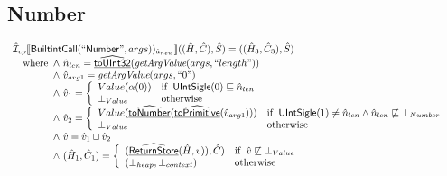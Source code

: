 \subsection{Number}
\[
\begin{array}{l}
\hat{\mathcal{I}} _{cp}\llbracket \mbox{\textsf{BuiltintCall}}(``\mbox{\textsf{Number}}",args))_{\hat{a}_{new}}\rrbracket((\hat{H},\hat{C}), \hat{S})
  = ((\hat{H}_3, \hat{C}_3), \hat{S})\\
\quad{\rm where}\begin{array}[t]{l}
  \land\ \hat{n}_{len} = \widehat{\underline{\sf toUInt32}}(\emph{getArgValue}(args, ``length"))\\
  \land\ \hat{v}_{arg1} = \emph{getArgValue}(args,``0")\\
  \land\ \hat{v}_1 = \left\{\begin{array}{ll}
      Value(\alpha(0)) & {\rm if}\begin{array}[t]{l}\mbox{\textsf{UIntSigle}}(0) \sqsubseteq \hat{n}_{len}\end{array}\\
      \bot_{Value} & {\rm otherwise}
    \end{array}\right.\\
  \land\ \hat{v}_2 = \left\{\begin{array}{ll}
      Value(\widehat{\underline{\sf toNumber}}(\widehat{\underline{\sf toPrimitive}}(\hat{v}_{arg1})))
      & {\rm if}\begin{array}[t]{l}\mbox{\textsf{UIntSigle}}(1) \neq \hat{n}_{len} \land \hat{n}_{len} \not\sqsubseteq \bot_{Number}\end{array}\\
      \bot_{Value} & {\rm otherwise}
    \end{array}\right.\\
  \land\ \hat{v} = \hat{v}_1 \sqcup \hat{v}_2\\
  \land\ (\hat{H}_1, \hat{C}_1) = 
    \left\{\begin{array}{ll}
      (\widehat{\underline{\sf ReturnStore}}(\hat{H}, v)), \hat{C})
      & {\rm if}\begin{array}[t]{l}\hat{v} \not\sqsubseteq \bot_{Value}\end{array}\\
      (\bot_{heap}, \bot_{context}) & {\rm otherwise} \\
    \end{array}\right.\\
  \end{array}\\
\\\\


\end{array}\]
